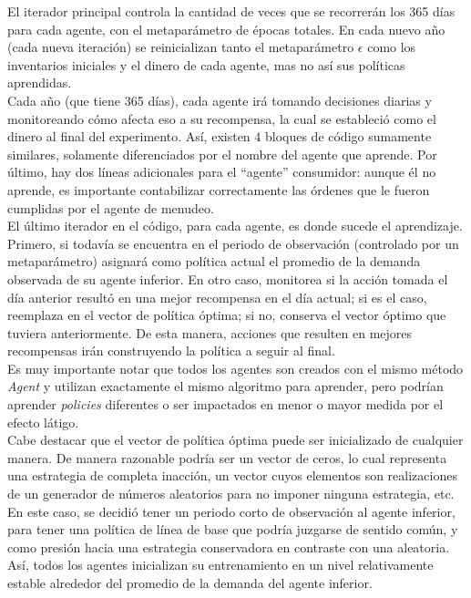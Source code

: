 El iterador principal controla la cantidad de veces que se recorrer\'an los 365 d\'ias para cada agente, con el metapar\'ametro de \'epocas totales. En cada nuevo a\~no (cada nueva iteraci\'on) se reinicializan tanto el metapar\'ametro $\epsilon$ como los inventarios iniciales y el dinero de cada agente, mas no as\'i sus pol\'iticas aprendidas.\\

Cada a\~no (que tiene 365 d\'ias), cada agente ir\'a tomando decisiones diarias y monitoreando c\'omo afecta eso a su recompensa, la cual se estableci\'o como el dinero al final del experimento. As\'i, existen $4$ bloques de c\'odigo sumamente similares, solamente diferenciados por el nombre del agente que aprende. Por \'ultimo, hay dos l\'ineas adicionales para el ``agente'' consumidor: aunque \'el no aprende, es importante contabilizar correctamente las \'ordenes que le fueron cumplidas por el agente de menudeo.\\

El \'ultimo iterador en el c\'odigo, para cada agente, es donde sucede el aprendizaje. Primero, si todav\'ia se encuentra en el periodo de observaci\'on (controlado por un metapar\'ametro) asignar\'a como pol\'itica actual el promedio de la demanda observada de su agente inferior. En otro caso, monitorea si la acci\'on tomada el d\'ia anterior result\'o en una mejor recompensa en el d\'ia actual; si es el caso, reemplaza en el vector de pol\'itica \'optima; si no, conserva el vector \'optimo que tuviera anteriormente. De esta manera, acciones que resulten en mejores recompensas ir\'an construyendo la pol\'itica a seguir al final.\\

Es muy importante notar que todos los agentes son creados con el mismo m\'etodo \textit{Agent} y utilizan exactamente el mismo algoritmo para aprender, pero podr\'ian aprender \textit{policies} diferentes o ser impactados en menor o mayor medida por el efecto l\'atigo.\\

Cabe destacar que el vector de pol\'itica \'optima puede ser inicializado de cualquier manera. De manera razonable podr\'ia ser un vector de ceros, lo cual representa una estrategia de completa inacci\'on, un vector cuyos elementos son realizaciones de un generador de n\'umeros aleatorios para no imponer ninguna estrategia, etc. En este caso, se decidi\'o tener un periodo corto de observaci\'on al agente inferior, para tener una pol\'itica de l\'inea de base que podr\'ia juzgarse de sentido com\'un, y como presi\'on hacia una estrategia conservadora en contraste con una aleatoria. As\'i, todos los agentes inicializan su entrenamiento en un nivel relativamente estable alrededor del promedio de la demanda del agente inferior.\\

